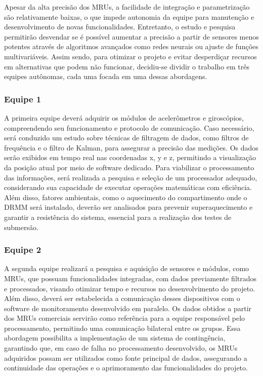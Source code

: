 \documentclass[a4paper, 12pt]{article}
\begin{document}
         Apesar da alta precisão dos MRUs, a facilidade de integração e parametrização são relativamente baixas, o que impede autonomia da equipe para manutenção e desenvolvimento de novas funcionalidades. Entretanto, o estudo e pesquisa permitirão desvendar se é possível aumentar a precisão a partir de sensores menos potentes através de algoritmos avançados como redes neurais ou ajuste de funções multivariáveis. Assim sendo, para otimizar o projeto e evitar desperdiçar recursos em alternativas que podem não funcionar, decidiu-se dividir o trabalho em três equipes autônomas, cada uma focada em uma dessas abordagens.
    
        \vspace{.15cm}
        \subsubsection{Equipe 1}
            A primeira equipe deverá adquirir os módulos de acelerômetros e giroscópios, compreendendo seu funcionamento e protocolo de comunicação. Caso necessário, será conduzido um estudo sobre técnicas de filtragem de dados, como filtros de frequência e o filtro de Kalman, para assegurar a precisão das medições. Os dados serão exibidos em tempo real nas coordenadas x, y e z, permitindo a visualização da posição atual por meio de software dedicado. Para viabilizar o processamento das informações, será realizada a pesquisa e seleção de um processador adequado, considerando sua capacidade de executar operações matemáticas com eficiência. Além disso, fatores ambientais, como o aquecimento do compartimento onde o DRMM será instalado, deverão ser analisados para prevenir superaquecimento e garantir a resistência do sistema, essencial para a realização dos testes de submersão.

        \vspace{.15cm}
        \subsubsection{Equipe 2}
            A segunda equipe realizará a pesquisa e aquisição de sensores e módulos, como MRUs, que possuam funcionalidades integradas, com dados previamente filtrados e processados, visando otimizar tempo e recursos no desenvolvimento do projeto. Além disso, deverá ser estabelecida a comunicação desses dispositivos com o software de monitoramento desenvolvido em paralelo. Os dados obtidos a partir dos MRUs comerciais servirão como referência para a equipe responsável pelo processamento, permitindo uma comunicação bilateral entre os grupos. Essa abordagem possibilita a implementação de um sistema de contingência, garantindo que, em caso de falha no processamento desenvolvido, os MRUs adquiridos possam ser utilizados como fonte principal de dados, assegurando a continuidade das operações e o aprimoramento das funcionalidades do projeto.
\end{document}
